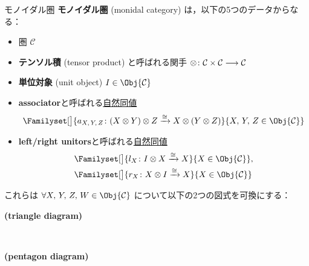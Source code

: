 \documentclass[TQFT_main]{subfiles}
\begin{document}
\begin{mydef}[label=redef:monoidal-category,breakable]{モノイダル圏}
    \textbf{モノイダル圏} (monidal category) は，以下の5つのデータからなる：
    \begin{itemize}
        \item 圏 $\mathcal{C}$
        \item \textbf{テンソル積} (tensor product) と呼ばれる関手 $\otimes \colon \mathcal{C} \times \mathcal{C} \longrightarrow \mathcal{C}$
        \item \textbf{単位対象} (unit object) $I \in \Obj{\mathcal{C}}$
        \item \textbf{associator}と呼ばれる\hyperref[def:nat]{自然同値}
        \begin{align}
            \Familyset[\big]{a_{X,\, Y,\, Z} \colon (X \otimes Y) \otimes Z \xrightarrow{\cong} X \otimes (Y \otimes Z)}{X,\, Y,\, Z \in \Obj{\mathcal{C}}}
        \end{align}
        \item \textbf{left/right unitors}と呼ばれる\hyperref[def:nat]{自然同値}
        \begin{align}
            &\Familyset[\big]{l_X \colon I \otimes X \xrightarrow{\cong} X}{X \in \Obj{\mathcal{C}}}, \\
            &\Familyset[\big]{r_X \colon X \otimes I \xrightarrow{\cong} X}{X \in \Obj{\mathcal{C}}}
        \end{align}
        
    \end{itemize}
    これらは $\forall X,\, Y,\, Z,\, W \in \Obj{\mathcal{C}}$ について以下の2つの図式を可換にする：
    \begin{description}
        \item[\textbf{(triangle diagram)}]　
        
        \begin{center}
        \end{center}
        
        \item[\textbf{(pentagon diagram)}]　
        

\end{description}
\end{mydef}
\end{document}
